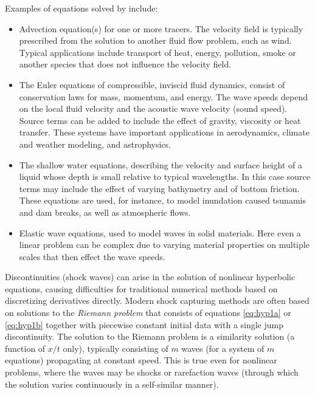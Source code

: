 Examples of equations solved by \clawpack include:
\begin{itemize}
  \item  Advection equation(s) for one or more tracers.  The velocity field is
    typically prescribed from the solution to another fluid flow problem, such
    as wind.  Typical applications include transport of heat, energy, pollution,
    smoke or another species that does not influence the velocity field.
    \item The Euler equations of compressible, inviscid fluid dynamics, consist
    of conservation laws for mass, momentum, and energy.
        The wave speeds depend on the local fluid velocity
        and the acoustic wave velocity (sound speed).  Source terms can be added
        to include the effect of gravity, viscosity or heat transfer.
        These systems have important applications in
        aerodynamics, climate and weather modeling, and astrophysics.
    \item The shallow water equations, describing the velocity and
        surface height of a liquid whose depth is small relative to
        typical wavelengths.  In this case source terms may include
        the effect of varying bathymetry and of bottom friction.
        These equations are used, for instance, to model inundation
        caused tsunamis and dam breaks, as well as atmospheric flows.
    \item Elastic wave equations, used to model waves in solid
    materials.  Here even a linear problem can be complex due to varying
    material properties on multiple scales that then effect the wave speeds.
\end{itemize}

Discontinuities (shock waves) can arise in the solution of nonlinear
hyperbolic equations, causing difficulties for traditional numerical
methods based on discretizing derivatives directly.  Modern shock
capturing methods are often based on solutions to the {\em Riemann
problem} that consists of equations \cref{eq:hyp1a} or
\cref{eq:hyp1b} together with piecewise constant initial data with a
single jump discontinuity.  The solution to the Riemann problem is a
similarity solution (a function of $x/t$ only), typically consisting
of $m$ waves (for a system of $m$ equations) propagating at constant
speed.  This is true even for nonlinear problems, where the waves may
be shocks or rarefaction waves (through which the
solution varies continuously in a self-similar manner).

